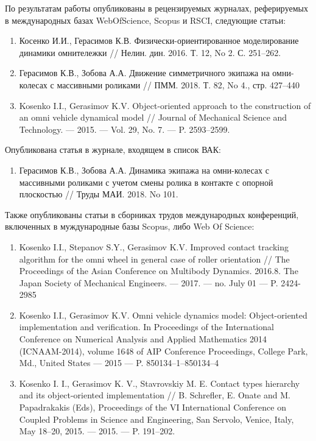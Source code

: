 По результатам работы опубликованы в рецензируемых журналах, реферируемых в международных базах WebOfScience, Scopus и RSCI, следующие статьи:

\begin{enumerate}
    \item Косенко И.И., Герасимов К.В. Физически-ориентированное моделирование динамики омнитележки // Нелин. дин. 2016. Т. 12, No 2. С. 251--262.
    \item Герасимов К.В., Зобова А.А. Движение симметричного экипажа на омни-колесах с массивными роликами // ПММ. 2018. Т. 82, No 4., стр. 427--440
    \item Kosenko I.I., Gerasimov K.V. Object-oriented approach to the construction of an omni vehicle dynamical model // Journal of Mechanical Science and Technology. — 2015. — Vol. 29, No. 7. — P. 2593--2599.
\end{enumerate}
Опубликована статья в журнале, входящем в список ВАК:
\begin{enumerate}
    \addtocounter{enumi}{3}
    \item Герасимов К.В., Зобова А.А. Динамика экипажа на омни-колесах с массивными роликами с учетом смены ролика в контакте с опорной плоскостью // Труды МАИ. 2018. No 101.
\end{enumerate}
Также опубликованы статьи в сборниках трудов международных конференций, включенных в муждународные базы Scopus, либо Web Of Science:
\begin{enumerate}
    \addtocounter{enumi}{4}
    \item Kosenko I.I., Stepanov S.Y., Gerasimov K.V. Improved contact tracking algorithm for the omni wheel in general case of roller orientation // The Proceedings of the Asian Conference on Multibody Dynamics. 2016.8. The Japan Society of Mechanical Engineers. — 2017. — no. July 01 — P. 2424-2985
    \item Kosenko I.I., Gerasimov K.V. Omni vehicle dynamics model: Object-oriented implementation and verification. In Proceedings of the International Conference on Numerical Analysis and Applied Mathematics 2014 (ICNAAM-2014), volume 1648 of AIP Conference Proceedings, College Park, Md., United States — 2015 — P. 850134–1–850134–4
    \item Kosenko I. I., Gerasimov K. V., Stavrovskiy M. E. Contact types hierarchy and its object-oriented implementation // B. Schrefler, E. Onate and M. Papadrakakis (Eds), Proceedings of the VI International Conference on Coupled Problems in Science and Engineering, San Servolo, Venice, Italy, May 18–20, 2015. — 2015. — P. 191–202.
\end{enumerate}
